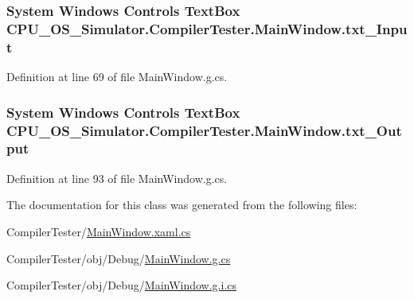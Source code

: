 \subsubsection[{txt\+\_\+\+Input}]{\setlength{\rightskip}{0pt plus 5cm}System Windows Controls Text\+Box C\+P\+U\+\_\+\+O\+S\+\_\+\+Simulator.\+Compiler\+Tester.\+Main\+Window.\+txt\+\_\+\+Input\hspace{0.3cm}{\ttfamily [package]}}\label{class_c_p_u___o_s___simulator_1_1_compiler_tester_1_1_main_window_a039f9d7d428bb5d6a3b84b701f323044}


Definition at line 69 of file Main\+Window.\+g.\+cs.

\hypertarget{class_c_p_u___o_s___simulator_1_1_compiler_tester_1_1_main_window_ab6483573f0239b9af7fedfd28c2b486b}{}
\subsubsection[{txt\+\_\+\+Output}]{\setlength{\rightskip}{0pt plus 5cm}System Windows Controls Text\+Box C\+P\+U\+\_\+\+O\+S\+\_\+\+Simulator.\+Compiler\+Tester.\+Main\+Window.\+txt\+\_\+\+Output\hspace{0.3cm}{\ttfamily [package]}}\label{class_c_p_u___o_s___simulator_1_1_compiler_tester_1_1_main_window_ab6483573f0239b9af7fedfd28c2b486b}


Definition at line 93 of file Main\+Window.\+g.\+cs.



The documentation for this class was generated from the following files\+:\begin{DoxyCompactItemize}
\item 
Compiler\+Tester/\hyperlink{_compiler_tester_2_main_window_8xaml_8cs}{Main\+Window.\+xaml.\+cs}\item 
Compiler\+Tester/obj/\+Debug/\hyperlink{_compiler_tester_2obj_2_debug_2_main_window_8g_8cs}{Main\+Window.\+g.\+cs}\item 
Compiler\+Tester/obj/\+Debug/\hyperlink{_compiler_tester_2obj_2_debug_2_main_window_8g_8i_8cs}{Main\+Window.\+g.\+i.\+cs}\end{DoxyCompactItemize}
